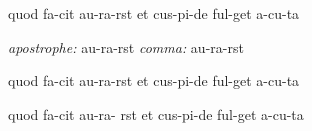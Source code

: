 \documentclass[english]{article}
\begin{document}
        {quod fa-cit au-ra-{rst} et cus-pi-de  ful-get  a-cu-ta}
        
\bigskip
\emph{apostrophe:}
        {au-ra-{rst}} \qquad
\emph{comma:}
\metrics{_  _  ,   _          }
        {au-ra-{rst}}



\bigskip
{}
        {quod fa-cit au-ra-{rst} et cus-pi-de  ful-get  a-cu-ta}

\bigskip
\newcommand{\fakesep}{
\raisebox{.83em}{{\rule{.04em}{6.47pt}}}\hspace{-3.6pt}
}
        {quod fa-cit au-ra-\fakesep{rst} et cus-pi-de  ful-get  a-cu-ta}

\bigskip
{}
\end{document}

